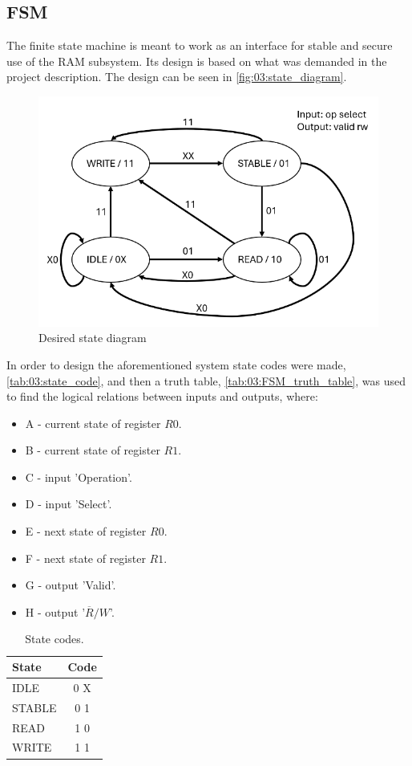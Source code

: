 \subsection{FSM}
The finite state machine is meant to work as an interface for stable and secure use of the RAM subsystem. Its design is based on what was demanded in the project description. The design can be seen in \autoref{fig:03:state_diagram}. 

\begin{figure}[H]
    \centering
    \includegraphics[width=0.6\linewidth]{LaTeX_2/Figures/state_diagram.png}
    \caption{Desired state diagram \cite{oppgavebeskrivelse}}
    \label{fig:03:state_diagram}
\end{figure}

In order to design the aforementioned system state codes were made, \autoref{tab:03:state_code}, and then a truth table, \autoref{tab:03:FSM_truth_table}, was used to find the logical relations between inputs and outputs, where:
\begin{itemize}
    \item A - current state of register $R0$.
    \item B - current state of register $R1$.
    \item C - input 'Operation'.
    \item D - input 'Select'.
    \item E - next state of register $R0$.
    \item F - next state of register $R1$.
    \item G - output 'Valid'.
    \item H - output '$\overline{R}/W$'.
\end{itemize}


\begin{table}[H]
    \caption{State codes.}
    \centering
    \begin{tabular}{|l|c|}
        \hline
        State   &   Code    \\  \hline
        IDLE    &   0 X     \\  
        STABLE  &   0 1     \\
        READ    &   1 0     \\
        WRITE   &   1 1     \\  \hline
    \end{tabular}
    \label{tab:03:state_code}
\end{table}


